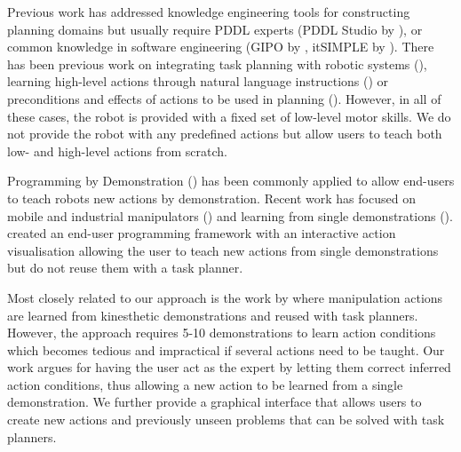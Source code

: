 Previous work has addressed knowledge engineering tools for constructing planning domains but usually require PDDL experts (PDDL Studio by \cite{plch2012inspect}), or common knowledge in software engineering (GIPO by \cite{simpson2007planning}, itSIMPLE by \cite{vaquero2013itsimple}).
There has been previous work on integrating task planning with robotic systems (\cite{cashmore2015rosplan,kuhner2018closed}), learning high-level actions through natural language instructions (\cite{she2014teaching}) or preconditions and effects of actions to be used in planning (\cite{jetchev2013learning,konidaris2018fromSkills,ugur2015bottom}).
However, in all of these cases, the robot is provided with a fixed set of low-level motor skills.
We do not provide the robot with any predefined actions but allow users to teach both low- and high-level actions from scratch.

Programming by Demonstration (\cite{argall2009survey,billard2008robot}) has been commonly applied to allow end-users to teach robots new actions by demonstration.
Recent work has focused on mobile and industrial manipulators (\cite{pedersen2014intuitive,huang2017code3,stenmark2017simplified}) and learning from single demonstrations (\cite{perez2017c,wu2010towards,yu2018one,tremblay2018synthetically}).
\citet{alexandrova2014robot} created an end-user programming framework with an interactive action visualisation allowing the user to teach new actions from single demonstrations but do not reuse them with a task planner.

Most closely related to our approach is the work by \citet{abdo2013learning} where manipulation actions are learned from kinesthetic demonstrations and reused with task planners.
However, the approach requires 5-10 demonstrations to learn action conditions which becomes tedious and impractical if several actions need to be taught.
Our work argues for having the user act as the expert by letting them correct inferred action conditions, thus allowing a new action to be learned from a single demonstration.
We further provide a graphical interface that allows users to create new actions and previously unseen problems that can be solved with task planners.


